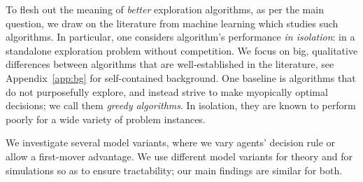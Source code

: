 To flesh out the meaning of \emph{better} exploration algorithms, as per the main question, we draw on the literature from machine learning which studies such algorithms. In particular, one considers algorithm's performance \emph{in isolation}: in a standalone exploration problem without competition. We focus on big, qualitative differences between algorithms that are well-established in the literature, see Appendix~\ref{app:bg} for self-contained background.
One baseline is algorithms that do not purposefully explore, and instead strive to make myopically optimal decisions; we call them \emph{greedy algorithms}. In isolation, they are known to perform poorly for a wide variety of problem instances.

We investigate several model variants, where we vary agents' decision rule or allow a first-mover advantage. We use different model variants for theory and for simulations so as to ensure tractability; our main findings are similar for both.





